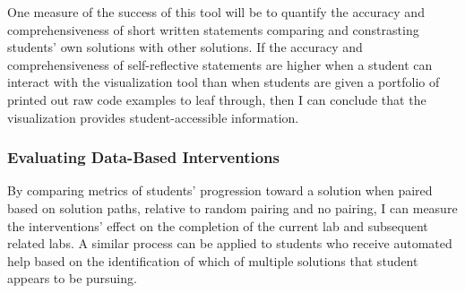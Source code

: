 \documentclass[12pt]{article}
\begin{document}
One measure of the success of this tool will be to quantify the accuracy and comprehensiveness of short written statements comparing and constrasting students' own solutions with other solutions. If the accuracy and comprehensiveness of self-reflective statements are higher when a student can interact with the visualization tool than when students are given a portfolio of printed out raw code examples to leaf through, then I can conclude that the visualization provides student-accessible information.

\subsubsection{Evaluating Data-Based Interventions}

By comparing metrics of students' progression toward a solution when paired based on solution paths, relative to random pairing and no pairing, I can measure the interventions' effect on the completion of the current lab and subsequent related labs. A similar process can be applied to students who receive automated help based on the identification of which of multiple solutions that student appears to be pursuing.










\end{document}

